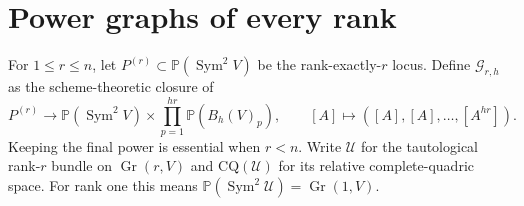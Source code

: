 \documentclass[11pt,reqno]{amsart}
\numberwithin{equation}{section}
\theoremstyle{definition}\newtheorem{definition}[theorem]{Definition}
\theoremstyle{remark}\newtheorem{remark}[theorem]{Remark}
\newcommand{\Pj}{\mathbb P}\newcommand{\A}{\mathbb A}
\DeclareMathOperator{\Sym}{Sym}\DeclareMathOperator{\Gr}{Gr}
\begin{document}
\section{Power graphs of every rank}
\label{sec:all-rank-graph-v158}
For $1\leq r\leq n$, let $P^{(r)}\subset\Pj(\Sym^2V)$ be the
rank-exactly-$r$ locus. Define $\mathcal G_{r,h}$ as the
scheme-theoretic closure of
\begin{equation}\label{eq:rank-graph-definition-v158}
 P^{(r)}\longrightarrow
 \Pj(\Sym^2V)\times\prod_{p=1}^{hr}\Pj(B_h(V)_p),
 \qquad[A]\longmapsto([A],[A],\ldots,[A^{hr}]).
\end{equation}
Keeping the final power is essential when $r<n$. Write $\mathcal U$
for the tautological rank-$r$ bundle on $\Gr(r,V)$ and
$\mathrm{CQ}(\mathcal U)$ for its relative complete-quadric space.
For rank one this means $\Pj(\Sym^2\mathcal U)=\Gr(1,V)$.
\end{document}

